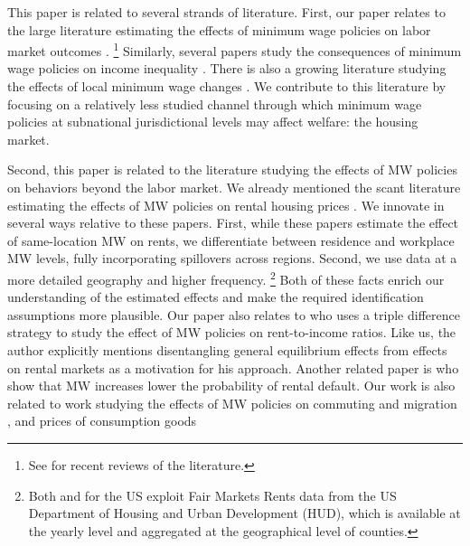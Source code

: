 
This paper is related to several strands of literature.
First, our paper relates to the large literature estimating the effects of 
minimum wage policies on labor market outcomes
\parencite{CardKrueger1994, NeumarkWascher2007,MeerWest2016,CegnizEtAl2019}.%
\footnote{See \textcite{Dube2019, NeumarkShirley2021} for recent reviews of the 
literature.}
Similarly, several papers study the consequences of minimum wage policies on 
income inequality \parencite{Lee1999, AutorEtAl2016}.
There is also a growing literature studying the effects of local minimum wage 
changes \parencite{DubeNaiduReich2007,SchmittRosnick2011,DubeLindner2021}.
We contribute to this literature by focusing on a relatively less studied 
channel through which minimum wage policies at subnational jurisdictional 
levels may affect welfare: the housing market.

Second, this paper is related to the literature studying the effects of MW 
policies on behaviors beyond the labor market.
We already mentioned the scant literature estimating the effects of MW policies
on rental housing prices \parencite{Tidemann2018, Yamagishi2021}.
We innovate in several ways relative to these papers.
First, while these papers estimate the effect of same-location MW on rents, we 
differentiate between residence and workplace MW levels, fully incorporating
spillovers across regions.
Second, we use data at a more detailed geography and higher frequency.%
\footnote{Both \textcite{Tidemann2018} and \textcite{Yamagishi2019} for the US 
exploit Fair Markets Rents data from the US Department of Housing and Urban 
Development (HUD), which is available at the yearly level and aggregated at the 
geographical level of counties.}
Both of these facts enrich our understanding of the estimated effects and make 
the required identification assumptions more plausible.
Our paper also relates to \textcite{Hughes2020} who uses a triple difference 
strategy to study the effect of MW policies on rent-to-income ratios. Like us, 
the author explicitly mentions disentangling general equilibrium effects from 
effects on rental markets as a motivation for his approach.%
Another related paper is \textcite{AgarwalEtAl2021} who show that MW increases 
lower the probability of rental default.
Our work is also related to work studying the effects of MW policies on 
commuting and migration \parencite{Cadena2014, Monras2019, PerezPerez2021}, and 
prices of consumption goods \parencite{AllegrettoReich2018, Leung2021}

